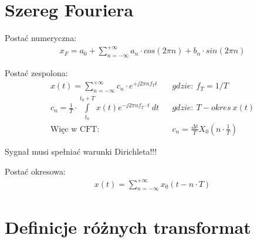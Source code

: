 \section{Szereg Fouriera}
    Postać numeryczna:
    \begin{gather*}
        x_F = a_0 + \sum\limits_{n=-\infty}^{+\infty}a_n\cdot cos\left(2\pi n\right) +b_n\cdot sin\left(2\pi n\right)
    \end{gather*}

    \noindent Postać zespolona:
    \begin{align*}
        x(t) = \sum\limits_{n=-\infty}^{+\infty}c_n\cdot e^{+j2\pi nf_T t} && gdzie:\ f_T = 1/T\\
        c_n = \frac{1}{T}\cdot \int\limits_{t_0}^{t_0+T}x(t) e^{-j2\pi nf_T\cdot t}\ dt && gdzie:\ T - okres\ x(t)\\
        \text{Więc w CFT:} && c_n = \frac{\Delta t}{T} X_0(n\cdot \frac{1}{T})
    \end{align*}
    \begin{center}
        Sygnał musi spełniać warunki Dirichleta!!!
    \end{center}

    \noindent Postać okresowa:
    \begin{align*}
        x(t) = \sum_{n=-\infty}^{+\infty} x_0(t-n\cdot T)
    \end{align*} 

\newpage
\section{Definicje różnych transformat}
